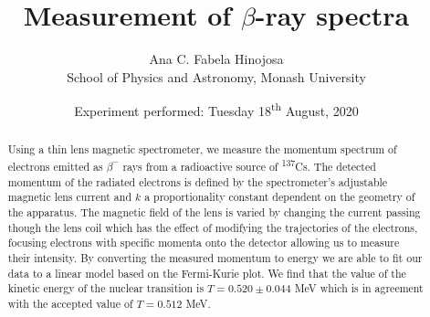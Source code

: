 \documentclass[12pt, a4paper]{article}
\title{Measurement of $\beta$-ray spectra}
\author{Ana C. Fabela Hinojosa\\
\small{School of Physics and Astronomy, Monash University}}
\date{Experiment performed: Tuesday 18\textsuperscript{th} August, 2020}
\begin{document}
\maketitle
\begin{abstract}
Using a thin lens magnetic spectrometer, we measure the momentum spectrum of electrons emitted as $\beta^{-}$ rays from a radioactive source of \textsuperscript{137}Cs. 
The detected momentum of the radiated electrons is defined by the spectrometer's adjustable magnetic lens current and $k$ a proportionality constant dependent on the geometry of the apparatus. The magnetic field of the lens is varied by changing the current passing though the lens coil which has the effect of modifying the trajectories of the electrons, focusing electrons with specific momenta onto the detector allowing us to measure their intensity. By converting the measured momentum to energy we are able to fit our data to a linear model based on the Fermi-Kurie plot. We find that the value of the kinetic energy of the nuclear transition is $T = 0.520 \pm 0.044$ MeV which is in agreement with the accepted value of $T = 0.512$ MeV\cite{SPA}.
\end{abstract}
\end{document}
